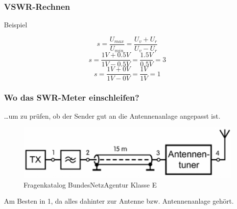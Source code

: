 \begin{frame}
  \frametitle{VSWR-Rechnen}
  \begin{exampleblock}{Beispiel}
    \begin{center}
      $$s = \frac{U_{max}}{U_{min}} = \frac{U_v + U_r}{U_v - U_r}$$
      $$s = \frac{1V + 0.5V}{1V - 0.5V} = \frac{1.5V}{0.5V} = 3$$
      $$s = \frac{1V + 0V}{1V - 0V} = \frac{1V}{1V} = 1$$
    \end{center}
  \end{exampleblock}
\end{frame}



\begin{frame}
  \frametitle{Wo das SWR-Meter einschleifen?}
  \ldots um zu prüfen, ob der Sender gut an die Antennenanlage angepasst ist.
  \begin{figure}
    \includegraphics[width=.97\textwidth,height=.4\textheight,keepaspectratio]{e17/SWROrt.png}
    \caption{Fragenkatalog BundesNetzAgentur Klasse E}
  \end{figure}
  \pause
  Am Besten in 1, da alles dahinter zur Antenne bzw. Antennenanlage gehört.
\end{frame}


